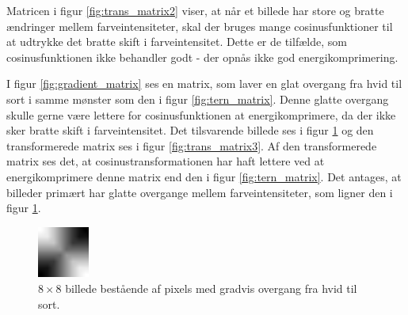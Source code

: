 Matricen i figur \ref{fig:trans_matrix2} viser, at når et billede har store og bratte ændringer mellem farveintensiteter, skal der bruges mange cosinusfunktioner til at udtrykke det bratte skift i farveintensitet. Dette er de tilfælde, som cosinusfunktionen ikke behandler godt - der opnås ikke god energikomprimering.

I figur \ref{fig:gradient_matrix} ses en matrix, som laver en glat overgang fra hvid til sort i samme mønster som den i figur \ref{fig:tern_matrix}. Denne glatte overgang skulle gerne være lettere for cosinusfunktionen at energikomprimere, da der ikke sker bratte skift i farveintensitet. Det tilsvarende billede ses i figur \ref{fig:gradient} og den transformerede matrix ses i figur \ref{fig:trans_matrix3}. Af den transformerede matrix ses det, at cosinustransformationen har haft lettere ved at energikomprimere denne matrix end den i figur \ref{fig:tern_matrix}. Det antages, at billeder primært har glatte overgange mellem farveintensiteter, som ligner den i figur \ref{fig:gradient}.
\begin{figure}[htbp]
\centering
\includegraphics[width=0.15\textwidth]{Billeder/8x8_eks6.png}
\caption{$8\times8$ billede bestående af pixels med gradvis overgang fra hvid til sort.}
\label{fig:gradient}
\end{figure}
